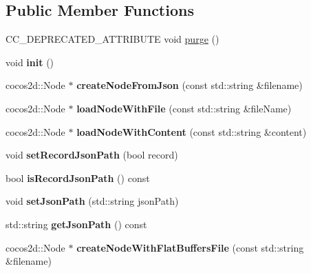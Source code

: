 \subsection*{Public Member Functions}
\begin{DoxyCompactItemize}
\item 
C\+C\+\_\+\+D\+E\+P\+R\+E\+C\+A\+T\+E\+D\+\_\+\+A\+T\+T\+R\+I\+B\+U\+TE void \hyperlink{classCSLoader_a999ed52182d8aa9392919405ca096b66}{purge} ()
\item 
\mbox{\label{classCSLoader_a82d87a1f1978e23a2b96765fd1975264}} 
void {\bfseries init} ()
\item 
\mbox{\label{classCSLoader_aa9dcd04bb97ceb4abc7fd6d33fd71e0c}} 
cocos2d\+::\+Node $\ast$ {\bfseries create\+Node\+From\+Json} (const std\+::string \&filename)
\item 
\mbox{\label{classCSLoader_a6ec31fb8f4889ad7214022e40f742520}} 
cocos2d\+::\+Node $\ast$ {\bfseries load\+Node\+With\+File} (const std\+::string \&file\+Name)
\item 
\mbox{\label{classCSLoader_a9ed038fd3b1e3cd45e7c80fcb732cc25}} 
cocos2d\+::\+Node $\ast$ {\bfseries load\+Node\+With\+Content} (const std\+::string \&content)
\item 
\mbox{\label{classCSLoader_a4a1296340a51d43ebb9e7339fdb4b45f}} 
void {\bfseries set\+Record\+Json\+Path} (bool record)
\item 
\mbox{\label{classCSLoader_ae925dbfcc8ddee4242803751c717d7d7}} 
bool {\bfseries is\+Record\+Json\+Path} () const
\item 
\mbox{\label{classCSLoader_a4adb303625952ffa42ff5d8476760e86}} 
void {\bfseries set\+Json\+Path} (std\+::string json\+Path)
\item 
\mbox{\label{classCSLoader_a8231ac76775b453241c4568c43139da8}} 
std\+::string {\bfseries get\+Json\+Path} () const
\item 
\mbox{\label{classCSLoader_a2699ba41e6e8c07e31ec1c14a9efb5d8}} 
cocos2d\+::\+Node $\ast$ {\bfseries create\+Node\+With\+Flat\+Buffers\+File} (const std\+::string \&filename)

\end{DoxyCompactItemize}
